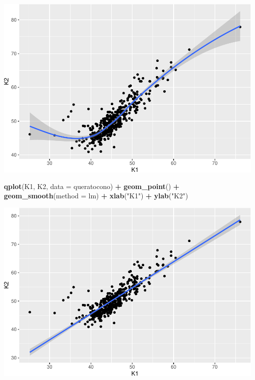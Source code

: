 \documentclass[
]{article}
\newenvironment{Shaded}{\begin{snugshade}}{\end{snugshade}}
\newcommand{\DataTypeTok}[1]{\textcolor[rgb]{0.13,0.29,0.53}{#1}}
\newcommand{\KeywordTok}[1]{\textcolor[rgb]{0.13,0.29,0.53}{\textbf{#1}}}
\newcommand{\NormalTok}[1]{#1}
\newcommand{\OperatorTok}[1]{\textcolor[rgb]{0.81,0.36,0.00}{\textbf{#1}}}
\newcommand{\StringTok}[1]{\textcolor[rgb]{0.31,0.60,0.02}{#1}}
\begin{document}
\includegraphics{document_files/figure-latex/unnamed-chunk-2-1.pdf}

\begin{Shaded}
\begin{Highlighting}[]
\KeywordTok{qplot}\NormalTok{(K1, K2, }\DataTypeTok{data =}\NormalTok{ queratocono) }\OperatorTok{+}
\StringTok{  }\KeywordTok{geom_point}\NormalTok{() }\OperatorTok{+}
\StringTok{  }\KeywordTok{geom_smooth}\NormalTok{(}\DataTypeTok{method =}\NormalTok{ lm) }\OperatorTok{+}
\StringTok{  }\KeywordTok{xlab}\NormalTok{(}\StringTok{"K1"}\NormalTok{) }\OperatorTok{+}\StringTok{ }\KeywordTok{ylab}\NormalTok{(}\StringTok{"K2"}\NormalTok{)}
\end{Highlighting}
\end{Shaded}

\includegraphics{document_files/figure-latex/unnamed-chunk-2-2.pdf}
\end{document}
